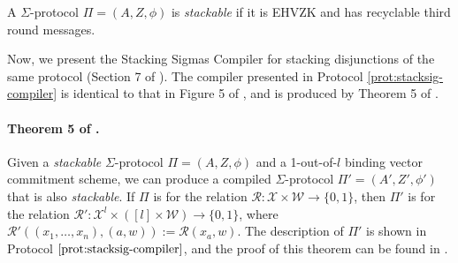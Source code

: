 \begin{definition}
  \label{def:stackable}
  A $\Sigma$-protocol $\Pi = (A, Z, \phi)$ is \textit{stackable} if it is EHVZK and has recyclable third round messages.
\end{definition}

  Now, we present the Stacking Sigmas Compiler for stacking disjunctions of the same protocol (Section 7 of \cite{StackingSigmas}). The compiler 
  presented in Protocol \ref{prot:stacksig-compiler} is identical to that in Figure 5 of \cite{StackingSigmas}, and is produced by Theorem 5 of \cite{StackingSigmas}.

  \paragraph{Theorem 5 of \cite{StackingSigmas}.} Given a \textit{stackable} $\Sigma$-protocol $\Pi = (A, Z, \phi)$ and a 
  1-out-of-$l$ binding vector commitment scheme, we can produce a compiled $\Sigma$-protocol $\Pi' = (A', Z', \phi')$ that is also \textit{stackable}. If 
  $\Pi$ is for the relation $\mathcal R: \mathcal X \times \mathcal W \rightarrow \{0,1\}$, then $\Pi'$ is for the relation $\mathcal R': \mathcal X^l \times 
  ([l] \times \mathcal W) \rightarrow \{0,1\}$, where $\mathcal R'((x_1,\ldots, x_n), (a,w)) := \mathcal R(x_a, w)$.
  The 
  description of $\Pi'$ is shown in Protocol $\ref{prot:stacksig-compiler}$, and the proof of this theorem can be found in \cite{StackingSigmas}.

